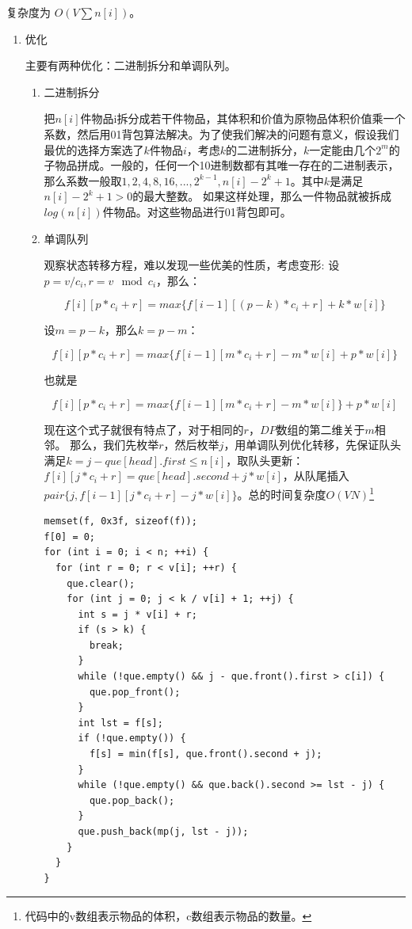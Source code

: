 \documentclass[11pt]{article}
\begin{document}
复杂度为 \(O(V  \sum n[i])\)。

\begin{enumerate}
\item 优化
\label{sec:orgb674a34}

主要有两种优化：二进制拆分和单调队列。

\begin{enumerate}
\item 二进制拆分
\label{sec:org535b7c6}


把\(n[i]\)件物品i拆分成若干件物品，其体积和价值为原物品体积价值乘一个系数，然后用01背包算法解决。为了使我们解决的问题有意义，假设我们最优的选择方案选了\(k\)件物品\(i\)，考虑\(k\)的二进制拆分，\(k\)一定能由几个\(2^m\)的子物品拼成。一般的，任何一个10进制数都有其唯一存在的二进制表示，那么系数一般取\(1,2,4,8,16,...,2^{k-1},n[i]-2^{k}+1\)。其中\(k\)是满足\(n[i]-2^k+1>0\)的最大整数。  
如果这样处理，那么一件物品就被拆成\(log(n[i])\)件物品。对这些物品进行01背包即可。

\item 单调队列
\label{sec:org1dcb90f}


观察状态转移方程，难以发现一些优美的性质，考虑变形:  
设\(p=v/c_{i},r=v \mod c_i\)，那么：

\[
f[i][p*c_i+r]=max\{f[i-1][(p-k)*c_i+r]+k*w[i]\}
\]

设\(m=p-k\)，那么\(k=p-m\)：

\[
f[i][p*c_i+r]=max\{f[i-1][m*c_i+r]-m*w[i]+p*w[i]\}
\]

也就是

\[
f[i][p*c_i+r]=max\{f[i-1][m*c_i+r]-m*w[i]\}+p*w[i]
\]

现在这个式子就很有特点了，对于相同的\(r\)，\(DP\)数组的第二维关于\(m\)相邻。  
那么，我们先枚举\(r\)，然后枚举\(j\)，用单调队列优化转移，先保证队头满足\(k=j-que[head].first \leq n[i]\)，取队头更新：\(f[i][j*c_i+r]=que[head].second+j*w[i]\)，从队尾插入\(pair\{j,f[i-1][j*c_i+r]-j*w[i]\}\)。总的时间复杂度\(O(V N)\)\footnote{代码中的v数组表示物品的体积，c数组表示物品的数量。}

\begin{verbatim}
memset(f, 0x3f, sizeof(f));
f[0] = 0;
for (int i = 0; i < n; ++i) {
  for (int r = 0; r < v[i]; ++r) {
    que.clear();
    for (int j = 0; j < k / v[i] + 1; ++j) {
      int s = j * v[i] + r;
      if (s > k) {
        break;
      }
      while (!que.empty() && j - que.front().first > c[i]) {
        que.pop_front();
      }
      int lst = f[s];
      if (!que.empty()) {
        f[s] = min(f[s], que.front().second + j);
      }
      while (!que.empty() && que.back().second >= lst - j) {
        que.pop_back();
      }
      que.push_back(mp(j, lst - j));
    }
  }
}
\end{verbatim}
\end{enumerate}
\end{enumerate}
\end{document}
